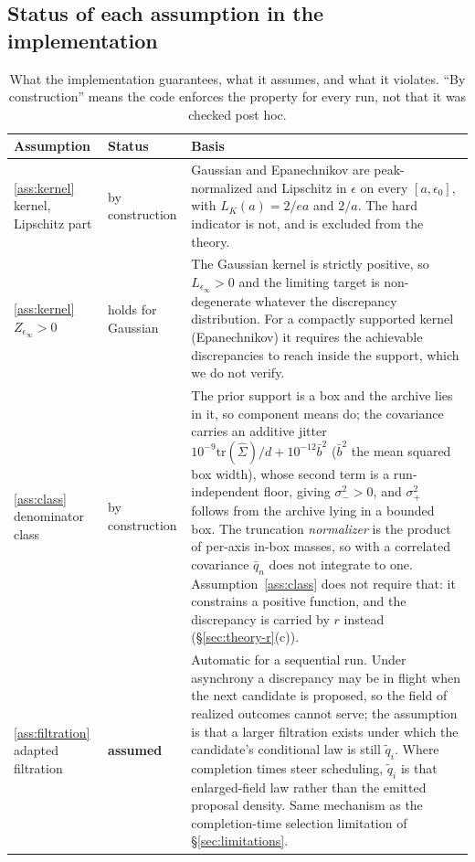 \documentclass[10pt]{article}
\theoremstyle{plain}
\theoremstyle{definition}
\begin{document}
\subsection{Status of each assumption in the implementation}\label{app:theory-status}
\begin{table}[h]
\caption{What the implementation guarantees, what it assumes, and what it violates. ``By construction'' means the code enforces the property for every run, not that it was checked post hoc.}\label{tab:assumption-status}
\centering
\footnotesize
\setlength{\tabcolsep}{3pt}
\begin{tabular}{@{}p{}p{}p{}@{}}
\toprule
Assumption & Status & Basis \\
\midrule
\ref{ass:kernel} kernel, Lipschitz part & by construction & Gaussian and Epanechnikov are peak-normalized and Lipschitz in $\epsilon$ on every $[a,\epsilon_0]$, with $L_K(a)=2/ea$ and $2/a$. The hard indicator is not, and is excluded from the theory. \\
\ref{ass:kernel} $Z_{\epsilon_\infty}>0$ & holds for Gaussian & The Gaussian kernel is strictly positive, so $L_{\epsilon_\infty}>0$ and the limiting target is non-degenerate whatever the discrepancy distribution. For a compactly supported kernel (Epanechnikov) it requires the achievable discrepancies to reach inside the support, which we do not verify. \\
\ref{ass:class} denominator class & by construction & The prior support is a box and the archive lies in it, so component means do; the covariance carries an additive jitter $10^{-9}\mathrm{tr}(\widehat\Sigma)/d+10^{-12}\bar b^2$ ($\bar b^2$ the mean squared box width), whose second term is a run-independent floor, giving $\sigma_-^2>0$, and $\sigma_+^2$ follows from the archive lying in a bounded box. The truncation \emph{normalizer} is the product of per-axis in-box masses, so with a correlated covariance $\bar q_n$ does not integrate to one. Assumption~\ref{ass:class} does not require that: it constrains a positive function, and the discrepancy is carried by $r$ instead (\S\ref{sec:theory-r}(c)). \\
\ref{ass:filtration} adapted filtration & \textbf{assumed} & Automatic for a sequential run. Under asynchrony a discrepancy may be in flight when the next candidate is proposed, so the field of realized outcomes cannot serve; the assumption is that a larger filtration exists under which the candidate's conditional law is still $\tilde q_i$. Where completion times steer scheduling, $\tilde q_i$ is that enlarged-field law rather than the emitted proposal density. Same mechanism as the completion-time selection limitation of \S\ref{sec:limitations}. \\

\end{tabular}
\end{table}
\end{document}
